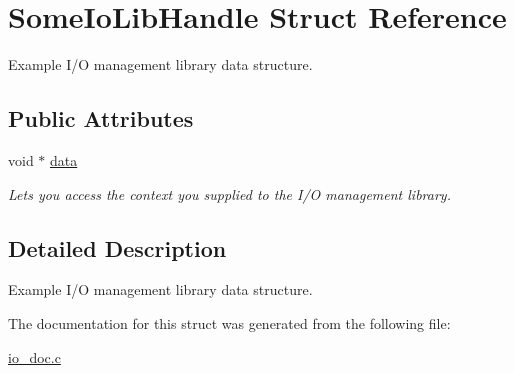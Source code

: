 \hypertarget{structSomeIoLibHandle}{}\section{Some\+Io\+Lib\+Handle Struct Reference}
\label{structSomeIoLibHandle}


Example I/O management library data structure.  


\subsection*{Public Attributes}
\begin{DoxyCompactItemize}
\item 
\mbox{\label{structSomeIoLibHandle_a3268457567f3ec3094c96c4bdf8424e5}} 
void $\ast$ \hyperlink{structSomeIoLibHandle_a3268457567f3ec3094c96c4bdf8424e5}{data}
\begin{DoxyCompactList}\small\item\em Let\textquotesingle{}s you access the context you supplied to the I/O management library. \end{DoxyCompactList}\end{DoxyCompactItemize}


\subsection{Detailed Description}
Example I/O management library data structure. 

The documentation for this struct was generated from the following file\+:\begin{DoxyCompactItemize}
\item 
\hyperlink{io__doc_8c}{io\+\_\+doc.\+c}\end{DoxyCompactItemize}
